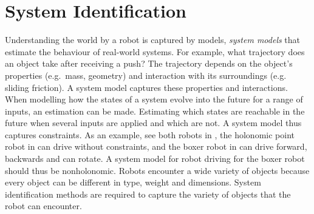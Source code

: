 \section{System Identification}%
\label{sec:sys_iden}
Understanding the world by a robot is captured by models, \textit{system models} that estimate the behaviour of real-world systems. For example, what trajectory does an object take after receiving a push? The trajectory depends on the object's properties (e.g.~mass, geometry) and interaction with its surroundings (e.g. sliding friction). A system model captures these properties and interactions. When modelling how the states of a system evolve into the future for a range of inputs, an estimation can be made. Estimating which states are reachable in the future when several inputs are applied and which are not. A system model thus captures constraints. As an example, see both robots in , the holonomic point robot in  can drive without constraints, and the boxer robot in  can drive forward, backwards and can rotate. A system model for robot driving for the boxer robot should thus be nonholonomic. Robots encounter a wide variety of objects because every object can be different in type, weight and dimensions. System identification methods are required to capture the variety of objects that the robot can encounter.\bs





